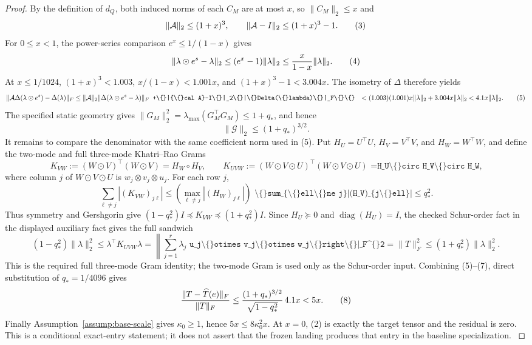 \begin{lemma}
\begin{proof}
By the definition of \(d_Q\), both induced norms of each \(C_M\) are at most
\(x\), so \(\|C_M\|_2\le x\) and
\[
 \|{\cal A}\|_2\le(1+x)^3,\qquad
 \|{\cal A}-I\|_2\le(1+x)^3-1.
\tag{3}
\]
For \(0\le x<1\), the power-series comparison \(e^x\le1/(1-x)\) gives
\[
 \|\lambda\odot e^s-\lambda\|_2
 \le(e^x-1)\|\lambda\|_2
 \le {x\over1-x}\|\lambda\|_2.
\tag{4}
\]
At \(x\le1/1024\), \((1+x)^3<1.003\),
\(x/(1-x)<1.001x\), and \((1+x)^3-1<3.004x\). The isometry of \(\Delta\)
therefore yields
\[
\begin{aligned}
 \|{\cal A}\Delta(\lambda\odot e^s)-\Delta(\lambda)\|_F
 &\le\|{\cal A}\|_2\|\Delta(\lambda\odot e^s-\lambda)\|_F
\texttt{  +\textbackslash\{\}|\{\textbackslash\{\}cal A\}-I\textbackslash\{\}|\_2\textbackslash\{\}|\textbackslash\{\}Delta(\textbackslash\{\}lambda)\textbackslash\{\}|\_F\textbackslash\{\}\textbackslash\{\}}
 &<(1.003)(1.001)x\|\lambda\|_2+3.004x\|\lambda\|_2
 <4.1x\|\lambda\|_2.
\end{aligned}
\tag{5}
\]
The specified static geometry gives
\(\|G_M\|_2^2=\lambda_{\max}(G_M^\top G_M)\le1+q_*\), and hence
\[
 \|{\mathscr G}\|_2\le(1+q_*)^{3/2}.
\tag{6}
\]
It remains to compare the denominator with the same coefficient norm used in
(5).  Put \(H_U=U^\top U\), \(H_V=V^\top V\), and \(H_W=W^\top W\), and
define the two-mode and full three-mode Khatri--Rao Grams
\[
 K_{VW}:=(W\odot V)^\top(W\odot V)=H_W\circ H_V,
 \qquad
 K_{UVW}:=(W\odot V\odot U)^\top(W\odot V\odot U)
\texttt{      =H\_U\textbackslash\{\}circ H\_V\textbackslash\{\}circ H\_W,}
\]
where column \(j\) of \(W\odot V\odot U\) is
\(w_j\otimes v_j\otimes u_j\).  For each row \(j\),
\[
 \sum_{\ell\ne j}|(K_{VW})_{j\ell}|
 \le \left(\max_{\ell\ne j}|(H_W)_{j\ell}|\right)
\texttt{   \textbackslash\{\}sum\_\{\textbackslash\{\}ell\textbackslash\{\}ne j\}|(H\_V)\_\{j\textbackslash\{\}ell\}|}
 \le q_*^2.
\]
Thus symmetry and Gershgorin give
\((1-q_*^2)I\preceq K_{VW}\preceq(1+q_*^2)I\).  Since
\(H_U\succeq0\) and \(\operatorname{diag}(H_U)=I\), the checked Schur-order
fact in the displayed auxiliary fact gives the full sandwich
\[
 (1-q_*^2)\|\lambda\|_2^2
 \le \lambda^\top K_{UVW}\lambda
 =\left\|\sum_{j=1}^r\lambda_j
\texttt{    u\_j\textbackslash\{\}otimes v\_j\textbackslash\{\}otimes w\_j\textbackslash\{\}right\textbackslash\{\}|\_F\textasciicircum\{\}2}
 =\|T\|_F^2
 \le(1+q_*^2)\|\lambda\|_2^2.
\tag{7}
\]
This is the required full three-mode Gram identity; the two-mode Gram is used
only as the Schur-order input.
Combining (5)--(7), direct substitution of \(q_*=1/4096\) gives
\[
 { \|T-\widehat T(e)\|_F\over\|T\|_F}
 \le { (1+q_*)^{3/2}\over\sqrt{1-q_*^2}}\,4.1x
 <5x.
\tag{8}
\]
Finally Assumption~\ref{assump:base-scale} gives \(\kappa_0\ge1\), hence
\(5x\le8\kappa_0^2x\).  At \(x=0\), (2) is exactly the target tensor and
the residual is zero.  This is a conditional exact-entry statement; it does
not assert that the frozen landing produces that entry in the baseline
specialization.
\(\)


\end{proof}
\end{lemma}
